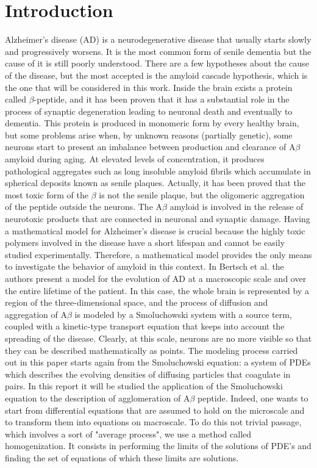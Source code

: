 \section{Introduction}
Alzheimer's disease (AD) is a neurodegenerative disease that usually starts slowly and progressively worsens. It is the most common form of senile dementia but the cause of it is still poorly understood. 
There are a few hypotheses about the cause of the disease, but the most accepted is the amyloid cascade hypothesis, which is the one that will be considered in this work.
Inside the brain exists a protein called \(\beta\)-peptide, and it has been proven that it has a substantial role in the process of synaptic degeneration leading to neuronal death and eventually to dementia. This protein is produced in monomeric form by every healthy brain, but some problems arise when,  by unknown reasons (partially genetic), some neurons start to present an imbalance between production and clearance of $\mathrm{A} \beta$ amyloid during aging. At elevated levels of concentration, it produces pathological aggregates such as long insoluble amyloid fibrils which accumulate in spherical deposits known as senile plaques. Actually, it has been proved that the most toxic form of the \(\beta\) is not the senile plaque, but the oligomeric aggregation of the peptide outside the neurons. The $\mathrm{A} \beta$ amyloid is involved in the release of neurotoxic products that are connected in neuronal and synaptic damage.
Having a mathematical model for Alzheimer's disease is crucial because the highly toxic polymers involved in the disease have a short lifespan and cannot be easily studied experimentally. Therefore, a mathematical model provides the only means to investigate the behavior of amyloid in this context.
In Bertsch et al. \cite{Bertsch} the authors present a model for the evolution of AD at a macroscopic scale and over the entire lifetime of the patient. In this case, the whole brain is represented by a region of the three-dimensional space, and the process of diffusion and aggregation of \(\mathrm{A}\beta\) is modeled by a Smoluchowski system with a source term, coupled with a kinetic-type transport equation that keeps into account the spreading of the disease. Clearly, at this scale, neurons are no more visible so that they can be described mathematically as points.
The modeling process carried out in this paper starts again from the Smoluchowski equation: a system of PDEs which describes the evolving densities of diffusing particles that coagulate in pairs. In this report it will be studied the application of the Smoluchowski equation to the description of agglomeration of $\mathrm{A} \beta$ peptide. Indeed, one wants to start from differential equations that are assumed to hold on the microscale and to transform them into equations on macroscale. To do this not trivial passage, which involves a sort of "average process", we use a method called homogenization. It consists in performing the limits of the solutions of PDE's and finding the set of equations of which these limits are solutions. 

